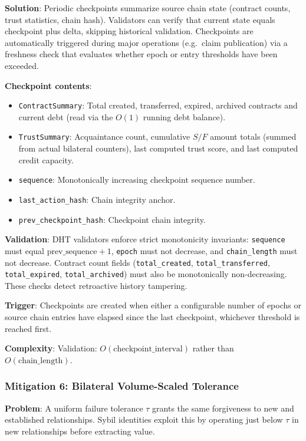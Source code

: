 \documentclass[11pt]{article}
\begin{document}
\textbf{Solution}: Periodic checkpoints summarize source chain state (contract counts, trust statistics, chain hash). Validators can verify that current state equals checkpoint plus delta, skipping historical validation. Checkpoints are automatically triggered during major operations (e.g.\ claim publication) via a freshness check that evaluates whether epoch or entry thresholds have been exceeded.

\textbf{Checkpoint contents}:
\begin{itemize}
    \item \texttt{ContractSummary}: Total created, transferred, expired, archived contracts and current debt (read via the $O(1)$ running debt balance).
    \item \texttt{TrustSummary}: Acquaintance count, cumulative $S/F$ amount totals (summed from actual bilateral counters), last computed trust score, and last computed credit capacity.
    \item \texttt{sequence}: Monotonically increasing checkpoint sequence number.
    \item \texttt{last\_action\_hash}: Chain integrity anchor.
    \item \texttt{prev\_checkpoint\_hash}: Checkpoint chain integrity.
\end{itemize}

\textbf{Validation}: DHT validators enforce strict monotonicity invariants: \texttt{sequence} must equal $\text{prev\_sequence} + 1$, \texttt{epoch} must not decrease, and \texttt{chain\_length} must not decrease. Contract count fields (\texttt{total\_created}, \texttt{total\_transferred}, \texttt{total\_expired}, \texttt{total\_archived}) must also be monotonically non-decreasing. These checks detect retroactive history tampering.

\textbf{Trigger}: Checkpoints are created when either a configurable number of epochs or source chain entries have elapsed since the last checkpoint, whichever threshold is reached first.

\textbf{Complexity}: Validation: $O(\text{checkpoint\_interval})$ rather than $O(\text{chain\_length})$.

\subsubsection{Mitigation 6: Bilateral Volume-Scaled Tolerance}

\textbf{Problem}: A uniform failure tolerance $\tau$ grants the same forgiveness to new and established relationships. Sybil identities exploit this by operating just below $\tau$ in new relationships before extracting value.
\end{document}
